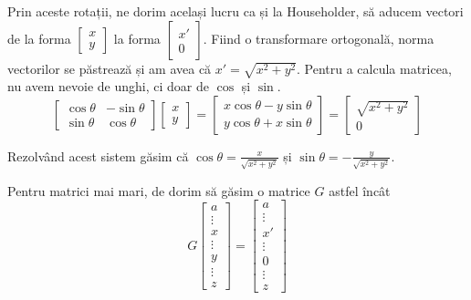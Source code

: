 \documentclass{exam}
\begin{document}
Prin aceste rotații, ne dorim același lucru ca și la Householder, să aducem
vectori de la forma $\begin{bmatrix} x \\ y \end{bmatrix}$ la forma
$\begin{bmatrix} x' \\ 0 \end{bmatrix}$. Fiind o transformare ortogonală, norma
vectorilor se păstrează și am avea că $x' = \sqrt{x^2 + y^2}$. Pentru a calcula
matricea, nu avem nevoie de unghi, ci doar de $\cos$ și $\sin$.
\begin{equation*}
	\begin{bmatrix} \cos \theta & -\sin \theta \\ \sin \theta & \cos \theta \end{bmatrix} \begin{bmatrix} x \\ y \end{bmatrix}
	= \begin{bmatrix} x \cos \theta - y \sin \theta \\ y \cos \theta + x \sin \theta \end{bmatrix}
	= \begin{bmatrix} \sqrt{x^2 + y^2} \\ 0 \end{bmatrix}
\end{equation*}

Rezolvând acest sistem găsim că $\cos \theta = \frac{x}{\sqrt{x^2 + y^2}}$ și
$\sin \theta = - \frac{y}{\sqrt{x^2 + y^2}}$.

Pentru matrici mai mari, de dorim să găsim o matrice $G$ astfel încât
\begin{equation*}
	G \begin{bmatrix} a \\ \vdots \\ x \\ \vdots \\ y \\ \vdots \\ z \end{bmatrix} = \begin{bmatrix} a \\ \vdots \\ x' \\ \vdots \\ 0 \\ \vdots \\ z \end{bmatrix}
\end{equation*}
\end{document}
